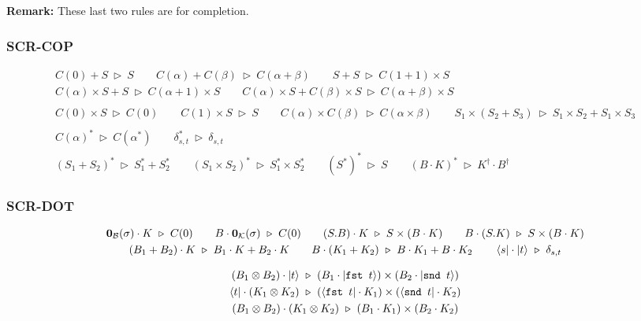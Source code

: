\documentclass[manuscript, review, timestamp]{acmart}
\newcommand*{\fst}{\texttt{fst }}
\newcommand*{\snd}{\texttt{snd }}
\newcommand*{\reduce}{\ \triangleright\ }
\begin{document}
\textbf{Remark:} These last two rules are for completion.


\subsubsection*{\textsf{SCR-COP}}
\begin{gather*}
   C(0) + S \reduce S
  \qquad
   C(\alpha) + C(\beta) \reduce C(\alpha + \beta)
  \qquad
   S + S \reduce C(1 + 1) \times S \\
   C(\alpha) \times S + S \reduce C(\alpha + 1) \times S
  \qquad
   C(\alpha) \times S + C(\beta) \times S \reduce C(\alpha + \beta) \times S
  \\
  \\
   C(0) \times S \reduce C(0)
  \qquad
   C(1) \times S \reduce S
  \qquad
   C(\alpha) \times C(\beta) \reduce C(\alpha \times \beta)
  \qquad
   S_1 \times (S_2 + S_3) \reduce S_1 \times S_2 + S_1 \times S_3
  \\
  \\
   C(\alpha)^* \reduce C(\alpha^*)
  \qquad
   \delta_{s, t}^* \reduce \delta_{s, t} \\
   (S_1 + S_2)^* \reduce S_1^* + S_2^*
  \qquad
   (S_1 \times S_2)^* \reduce S_1^* \times S_2^*
  \qquad
   (S^*)^* \reduce S
  \qquad
   (B \cdot K)^* \reduce K^\dagger \cdot B^\dagger
\end{gather*}



\subsubsection*{\textsf{SCR-DOT}}
\begin{gather*}
  \mathbf{0}_\mathcal{B}(\sigma) \cdot K \reduce C(0)
  \qquad
  B \cdot \mathbf{0}_\mathcal{K}(\sigma) \reduce C(0)
  \qquad
  (S.B) \cdot K \reduce S \times (B \cdot K)
  \qquad
  B \cdot (S.K) \reduce S \times (B \cdot K) \\
  (B_1 + B_2) \cdot K \reduce B_1 \cdot K + B_2 \cdot K
  \qquad
  B \cdot (K_1 + K_2) \reduce B \cdot K_1 + B \cdot K_2
  \qquad
  \bra{s} \cdot \ket{t} \reduce \delta_{s, t} \\
\end{gather*}

\begin{gather*}
  (B_1 \otimes B_2) \cdot \ket{t} \reduce (B_1 \cdot \ket{\fst t}) \times (B_2 \cdot \ket{\snd t}) \\
  \bra{t} \cdot (K_1 \otimes K_2) \reduce (\bra{\fst t} \cdot K_1) \times (\bra{\snd t} \cdot K_2) \\
  (B_1 \otimes B_2) \cdot (K_1 \otimes K_2) \reduce (B_1 \cdot K_1) \times (B_2 \cdot K_2)
\end{gather*}
\end{document}
